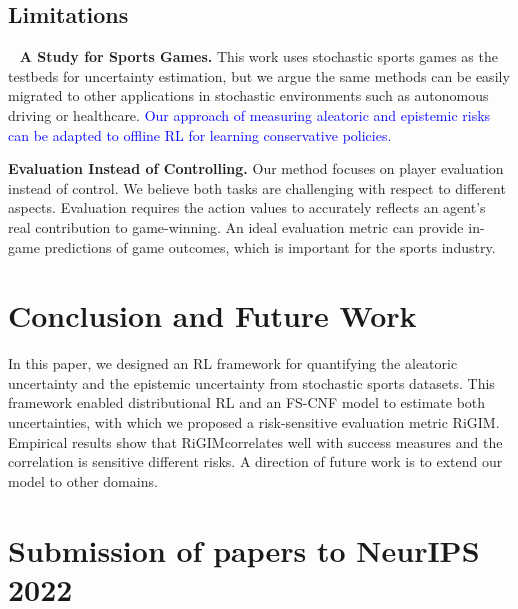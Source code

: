 \documentclass{article}
\newcommand{\sys}{RiGIM}
\newcommand{\system}{\sys\;}
\begin{document}
\vspace{-0.05in}
\subsection{Limitations}~\label{subsec:limitations}
\noindent\textbf{A Study for Sports Games.} This work uses stochastic sports games as the testbeds for uncertainty estimation, but we argue the same methods can be easily migrated to other applications in stochastic environments such as autonomous driving or healthcare. \textcolor{blue}{Our approach of measuring aleatoric and epistemic risks can be adapted to offline RL for learning conservative policies.}

\noindent\textbf{Evaluation Instead of Controlling.} Our method focuses on player evaluation instead of control. We believe both tasks are challenging with respect to different aspects. Evaluation requires the action values to accurately reflects an agent's real contribution to game-winning. An ideal evaluation metric can provide in-game predictions of game outcomes, which is important for the sports industry.
\vspace{-0.05in}
\section{Conclusion and Future Work}
\vspace{-0.05in}
In this paper, we designed an RL framework for quantifying the aleatoric uncertainty and the epistemic uncertainty from stochastic sports datasets. This framework enabled distributional RL and an FS-CNF model to estimate both uncertainties, with which we proposed a risk-sensitive evaluation metric \system. Empirical results show that \system correlates well with success measures and the correlation is sensitive different risks. A direction of future work is to extend our model to other domains.




\newpage

\section{Submission of papers to NeurIPS 2022}
\end{document}
